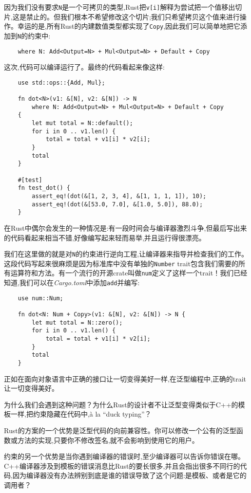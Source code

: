 因为我们没有要求\texttt{N}是一个可拷贝的类型,Rust把\texttt{v[i]}解释为尝试把一个值移出切片,这是禁止的。但我们根本不希望修改这个切片;我们只希望拷贝这个值来进行操作。幸运的是,所有Rust的内建数值类型都实现了\texttt{Copy},因此我们可以简单地把它添加到\texttt{N}的约束中:
\begin{verbatim}
    where N: Add<Output=N> + Mul<Output=N> + Default + Copy
\end{verbatim}

这次,代码可以编译运行了。最终的代码看起来像这样:
\begin{verbatim}
    use std::ops::{Add, Mul};

    fn dot<N>(v1: &[N], v2: &[N]) -> N
        where N: Add<Output=N> + Mul<Output=N> + Default + Copy
    {
        let mut total = N::default();
        for i in 0 .. v1.len() {
            total = total + v1[i] * v2[i];
        }
        total
    }

    #[test]
    fn test_dot() {
        assert_eq!(dot(&[1, 2, 3, 4], &[1, 1, 1, 1]), 10);
        assert_eq!(dot(&[53.0, 7.0], &[1.0, 5.0]), 88.0);
    }
\end{verbatim}

在Rust中偶尔会发生的一种情况是:有一段时间会与编译器激烈斗争,但最后写出来的代码看起来相当不错,好像编写起来轻而易举,并且运行得很漂亮。 

我们在这里做的就是对\texttt{N}的约束进行逆向工程,让编译器来指导并检查我们的工作。这段代码写起来很麻烦是因为标准库中没有单独的\texttt{Number} trait包含我们需要的所有运算符和方法。有一个流行的开源crate叫做\texttt{num}定义了这样一个trait！我们已经知道,我们可以在\emph{Cargo.toml}中添加\texttt{add}并编写:
\begin{verbatim}
    use num::Num;

    fn dot<N: Num + Copy>(v1: &[N], v2: &[N]) -> N {
        let mut total = N::zero();
        for i in 0 .. v1.len() {
            total = total + v1[i] * v2[i];
        }
        total
    }
\end{verbatim}

正如在面向对象语言中正确的接口让一切变得美好一样,在泛型编程中,正确的trait让一切变得美好。

为什么我们会遇到这种问题？为什么Rust的设计者不让泛型变得类似于C++的模板一样,把约束隐藏在代码中,à la “duck typing”？

Rust的方案的一个优势是泛型代码的向前兼容性。你可以修改一个公有的泛型函数或方法的实现,只要你不修改签名,就不会影响到使用它的用户。

约束的另一个优势是当你遇到编译器的错误时,至少编译器可以告诉你错误在哪。C++编译器涉及到模板的错误消息比Rust的要长很多,并且会指出很多不同行的代码,因为编译器没有办法辨别到底是谁的错误导致了这个问题:是模板、或者是它的调用者？

